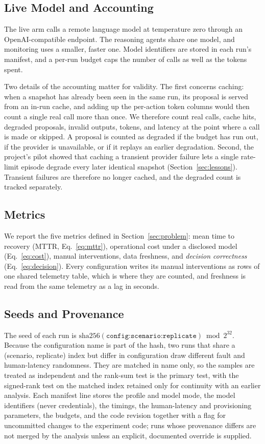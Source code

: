 \subsection{Live Model and Accounting}
The live arm calls a remote language model at temperature zero through an OpenAI-compatible endpoint.
The reasoning agents share one model, and monitoring uses a smaller, faster one. Model identifiers
are stored in each run's manifest, and a per-run budget caps the number of calls as well as the tokens
spent.

Two details of the accounting matter for validity. The first concerns caching: when a snapshot has
already been seen in the same run, its proposal is served from an in-run cache, and adding up the
per-action token columns would then count a single real call more than once. We therefore count real calls, cache hits, degraded proposals, invalid outputs,
tokens, and latency at the point where a call is made or skipped. A proposal is counted as degraded if
the budget has run out, if the provider is unavailable, or if it replays an earlier degradation.
Second, the project's pilot showed that caching a transient provider failure lets a single
rate-limit episode degrade every later identical snapshot (Section~\ref{sec:lessons}). Transient
failures are therefore no longer cached, and the degraded count is tracked separately.

\subsection{Metrics}
We report the five metrics defined in Section~\ref{sec:problem}: mean time to recovery (MTTR,
Eq.~\eqref{eq:mttr}), operational cost under a disclosed model (Eq.~\eqref{eq:cost}), manual
interventions, data freshness, and \emph{decision correctness} (Eq.~\eqref{eq:decision}). Every
configuration writes its manual interventions as rows of one shared telemetry table, which is where
they are counted, and freshness is read from the same telemetry as a lag in seconds.

\subsection{Seeds and Provenance}
The seed of each run is $\mathrm{sha256}(\texttt{config:scenario:replicate}) \bmod 2^{32}$. Because the
configuration name is part of the hash, two runs that share a (scenario, replicate) index but differ
in configuration draw different fault and human-latency randomness. They are matched in name only, so
the samples are treated as independent and the rank-sum test is the primary test, with the signed-rank
test on the matched index retained only for continuity with an earlier analysis. Each manifest line
stores the profile and model mode, the model identifiers (never credentials), the timings, the
human-latency and provisioning parameters, the budgets, and the code revision together with a flag for
uncommitted changes to the experiment code; runs whose provenance differs are not merged by the
analysis unless an explicit, documented override is supplied.

